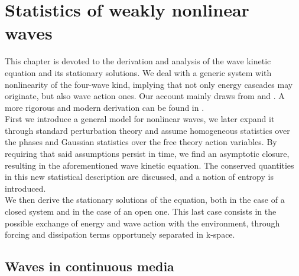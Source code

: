 \newpage
\phantom{}
\thispagestyle{empty}
\section{Statistics of weakly nonlinear waves}
This chapter is devoted to the derivation and analysis of the wave kinetic equation and its stationary solutions. We deal with a generic system with nonlinearity of the four-wave kind, implying that not only energy cascades may originate, but also wave action ones. Our account mainly draws from \cite{Onorato2020} and 
\cite{Zakharov}. A more rigorous and modern derivation can be found in \cite{Nazarenko2011}. \\
First we introduce a general model for nonlinear waves, we later expand it through standard perturbation theory and assume homogeneous statistics over the phases 
and Gaussian statistics over the free theory action variables. By requiring that said assumptions persist in time, we find an asymptotic closure, 
resulting in the aforementioned wave kinetic equation. The conserved quantities in this new statistical description are discussed, and a notion of entropy is introduced. \\
We then derive the stationary solutions of the equation, both in the case of a closed system and  in the case of an open one. This last case consists in the possible exchange of energy 
and wave action with the environment, through forcing and dissipation terms opportunely separated in k-space.\\ 

\subsection{Waves in continuous media}

